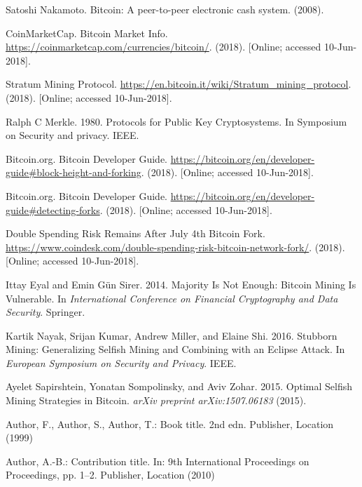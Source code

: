 \documentclass[a4paper, 11pt]{article}
\begin{document}
\begin{CJK*}{UTF8}{gbsn}
    \newpage
    \begin{thebibliography}{8}

    Satoshi Nakamoto. Bitcoin: A peer-to-peer electronic cash system. (2008).

    CoinMarketCap. Bitcoin Market Info. 
    \url{https://coinmarketcap.com/currencies/bitcoin/}. 
    (2018). [Online; accessed 10-Jun-2018].


    Stratum Mining Protocol. 
    \url{https://en.bitcoin.it/wiki/Stratum_mining_protocol}.
    (2018). [Online; accessed 10-Jun-2018].
    
    
    Ralph C Merkle. 1980. Protocols for Public Key Cryptosystems. In Symposium on
    Security and privacy. IEEE.

    Bitcoin.org. Bitcoin Developer Guide. 
    \url{https://bitcoin.org/en/developer-guide#block-height-and-forking}.
    (2018). [Online; accessed 10-Jun-2018].


    Bitcoin.org. Bitcoin Developer Guide. 
    \url{https://bitcoin.org/en/developer-guide#detecting-forks}.
    (2018). [Online; accessed 10-Jun-2018].

    Double Spending Risk Remains After July 4th Bitcoin Fork.
    \url{https://www.coindesk.com/double-spending-risk-bitcoin-network-fork/}. 
    (2018). [Online; accessed 10-Jun-2018].

    Ittay Eyal and Emin Gün Sirer. 2014. Majority Is Not Enough: Bitcoin Mining
    Is Vulnerable. 
    In \textit{International Conference on Financial Cryptography and Data
    Security}. Springer.

    Kartik Nayak, Srijan Kumar, Andrew Miller, and Elaine Shi. 2016. Stubborn
    Mining: Generalizing Selfish Mining and Combining with an Eclipse Attack. 
    In \textit{European Symposium on Security and Privacy}. IEEE.

    Ayelet Sapirshtein, Yonatan Sompolinsky, and Aviv Zohar. 2015. Optimal Selfish
    Mining Strategies in Bitcoin.
    \textit{arXiv preprint arXiv:1507.06183} (2015).

    Author, F., Author, S., Author, T.: Book title. 2nd edn. Publisher,
    Location (1999)
    
    Author, A.-B.: Contribution title. In: 9th International Proceedings
    on Proceedings, pp. 1--2. Publisher, Location (2010)
    
    \end{thebibliography}
    
    \end{CJK*}
    

    

    
\end{document}

